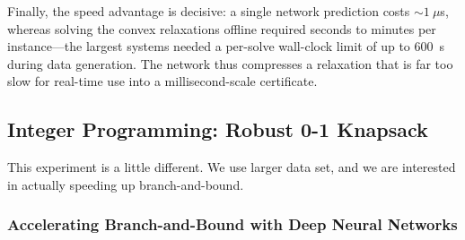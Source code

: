 \documentclass[10pt]{article} %
\theoremstyle{plain}
\theoremstyle{definition}
\theoremstyle{remark}
\begin{document}
Finally, the speed advantage is decisive: a single network prediction costs $\sim\!1~\mu$s, whereas solving the convex relaxations offline required seconds to minutes per instance---the largest systems needed a per-solve wall-clock limit of up to $600$~s during data generation. The network thus compresses a relaxation that is far too slow for real-time use into a millisecond-scale certificate.

\subsection{Integer Programming: Robust 0-1 Knapsack}

This experiment is a little different. We use larger data set, and we are interested in actually speeding up branch-and-bound.

\subsubsection*{Accelerating Branch-and-Bound with Deep Neural Networks}




\end{document}

